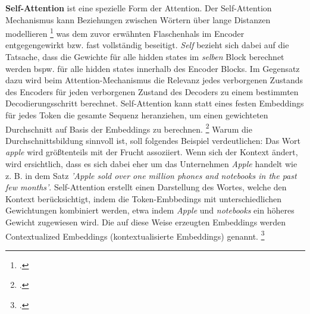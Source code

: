 \textbf{Self-Attention} ist eine spezielle Form der Attention. Der Self-Attention Mechanismus kann Beziehungen zwischen Wörtern über lange Distanzen modellieren \footcites[Vgl.][S. 3]{ramachandran_stand-alone_2019} was dem zuvor erwähnten Flaschenhals im Encoder entgegengewirkt bzw. fast vollständig beseitigt. \emph{Self} bezieht sich dabei auf die Tatsache, dass die Gewichte für alle hidden states im \emph{selben} Block berechnet werden bspw. für alle hidden states innerhalb des Encoder Blocks. Im Gegensatz dazu wird beim Attention-Mechanismus die Relevanz jedes verborgenen Zustands des Encoders für jeden verborgenen Zustand des Decoders zu einem bestimmten Decodierungsschritt berechnet. Self-Attention kann statt eines festen Embeddings für jedes Token die gesamte Sequenz heranziehen, um einen gewichteten Durchschnitt auf Basis der Embeddings zu berechnen. \footcites[Vgl.][S. 61]{tunstall_natural_2022} Warum die Durchschnittsbildung sinnvoll ist, soll folgendes Beispiel verdeutlichen: Das Wort \emph{apple} wird größtenteils mit der Frucht assoziiert. Wenn sich der Kontext ändert, wird ersichtlich, dass es sich dabei eher um das Unternehmen \emph{Apple} handelt wie z. B. in dem Satz \emph{'Apple sold over one million phones and notebooks in the past few months'}. Self-Attention erstellt einen Darstellung des Wortes, welche den Kontext berücksichtigt, indem die Token-Embbedings mit unterschiedlichen Gewichtungen kombiniert werden, etwa indem \emph{Apple} und \emph{notebooks} ein höheres Gewicht zugewiesen wird. Die auf diese Weise erzeugten Embeddings werden Contextualized Embeddings (kontextualisierte Embeddings) genannt. \footcites[Vgl.][S. 1]{peters_deep_2018}

